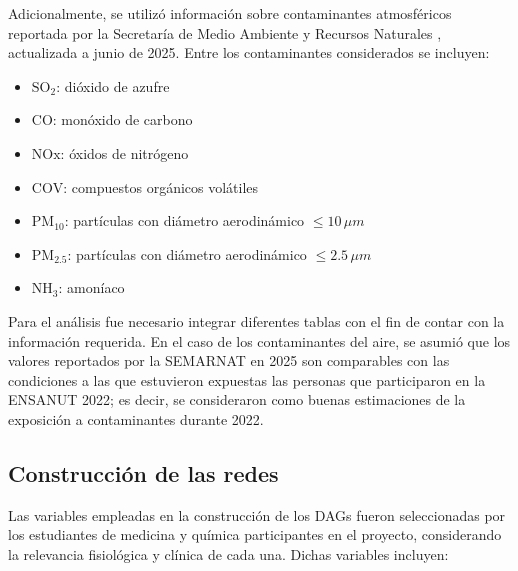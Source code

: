 \documentclass[eng]{ajceam-class}
\begin{document}
Adicionalmente, se utilizó información sobre contaminantes atmosféricos reportada por la Secretaría de Medio Ambiente y Recursos Naturales \cite{semarnat}, actualizada a junio de 2025. Entre los contaminantes considerados se incluyen:


\begin{itemize}
    \item \(\text{SO}_{2}\): dióxido de azufre  
    \item \(\text{CO}\): monóxido de carbono  
    \item \(\text{NOx}\): óxidos de nitrógeno  
    \item \(\text{COV}\): compuestos orgánicos volátiles  
    \item \(\text{PM}_{10}\): partículas con diámetro aerodinámico \(\leq 10\,\mu m\)  
    \item \(\text{PM}_{2.5}\): partículas con diámetro aerodinámico \(\leq 2.5\,\mu m\)  
    \item \(\text{NH}_{3}\): amoníaco  
\end{itemize}  

Para el análisis fue necesario integrar diferentes tablas con el fin de contar con la información requerida. En el caso de los contaminantes del aire, se asumió que los valores reportados por la SEMARNAT en 2025 son comparables con las condiciones a las que estuvieron expuestas las personas que participaron en la ENSANUT 2022; es decir, se consideraron como buenas estimaciones de la exposición a contaminantes durante 2022. 

\subsection{Construcción de las redes}

Las variables empleadas en la construcción de los DAGs fueron seleccionadas por los estudiantes de medicina y química participantes en el proyecto, considerando la relevancia fisiológica y clínica de cada una. Dichas variables incluyen:
\end{document}
